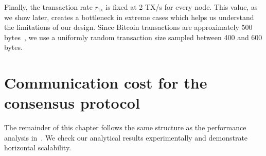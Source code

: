 Finally, the transaction rate $r_{\text{tx}}$ is fixed at 2 TX/s for every node.
This value, as we show later,
creates a bottleneck in extreme cases which helps us understand the limitations of our design.
Since Bitcoin transactions are approximately 500 bytes~\cite{txsize},
we use a uniformly random transaction size sampled between 400 and 600 bytes.


\section{Communication cost for the consensus protocol}
\label{sec:comms-cost-experiment}

The remainder of this chapter follows the same structure as the performance analysis in~.
We check our analytical results experimentally and demonstrate horizontal scalability.

